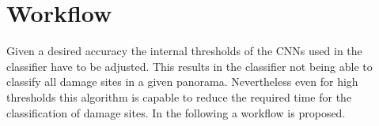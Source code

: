 \chapter{Workflow}

Given a desired accuracy the internal thresholds of the CNNs used in the classifier have to be adjusted. This results in the classifier not being able to classify all damage sites in a given panorama. Nevertheless even for high thresholds this algorithm is capable to reduce the required time for the classification of damage sites. In the following a workflow is proposed.

